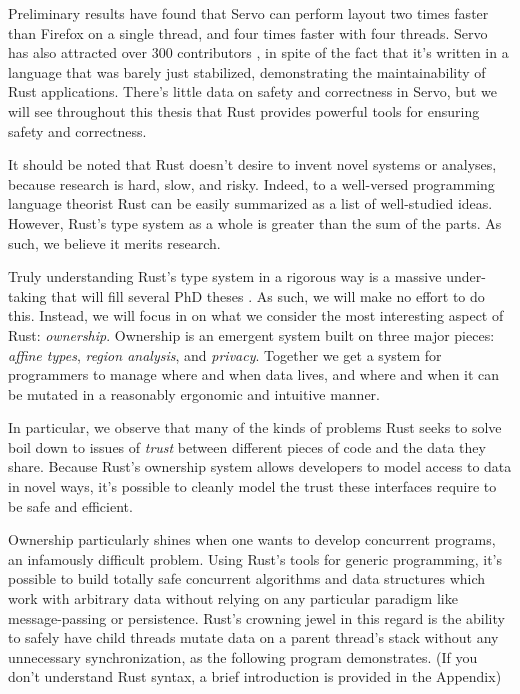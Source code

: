 Preliminary results \cite{servo-exp} have found that Servo can
perform layout two times faster than Firefox on a single thread, and four times
faster with four threads. Servo has also attracted over 300 contributors \cite{servo-gh},
in spite of the fact that it's written in a language that was barely just
stabilized, demonstrating the maintainability of Rust applications. There's
little data on safety and correctness in Servo, but we will see throughout this
thesis that Rust provides powerful tools for ensuring safety and correctness.

It should be noted that Rust doesn't desire to invent novel systems or analyses,
because research is hard, slow, and risky. Indeed, to a well-versed programming
language theorist Rust can be easily summarized as a list of well-studied
ideas. However, Rust's type system as a whole is greater than the sum
of the parts. As such, we believe it merits research.

Truly understanding Rust's type system in a rigorous way is a massive
under-taking that will fill several PhD theses \cite{rustbelt}. As such, we will make no effort
to do this. Instead, we will focus in on what we consider the most interesting
aspect of Rust: \emph{ownership}. Ownership is an emergent system built on three
major pieces: \emph{affine types}, \emph{region analysis}, and \emph{privacy}. Together we get
a system for programmers to manage where and when data lives, and where
and when it can be mutated in a reasonably ergonomic and intuitive manner.

In particular,
we observe that many of the kinds of problems Rust seeks to solve boil down
to issues of \emph{trust} between different pieces of code and the data they share.
Because Rust's ownership system allows developers to model access to data in
novel ways, it's possible to cleanly model the trust these interfaces require to be
safe and efficient.

Ownership particularly shines when one wants to develop concurrent programs,
an infamously difficult problem. Using Rust's tools for generic programming,
it's possible to build totally safe concurrent algorithms and data structures
which work with arbitrary data without relying on any particular paradigm like
message-passing or persistence. Rust's crowning jewel in this regard is the
ability to safely have child threads mutate data on a parent thread's stack
without any unnecessary synchronization, as the following program demonstrates. (If you
don't understand Rust syntax, a brief introduction is provided in the Appendix)

